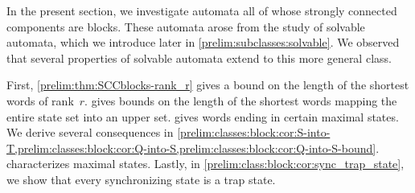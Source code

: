 
In the present section, we investigate automata all of whose strongly connected components are blocks. These automata arose from the study of solvable automata, which we introduce later in \cref{prelim:subclasses:solvable}. We observed that several properties of solvable automata extend to this more general class.

First, \cref{prelim:thm:SCCblocks-rank_r} gives a bound on the length of the shortest words of rank~$r$.  gives bounds on the length of the shortest words mapping the entire state set into an upper set.  gives words ending in certain maximal states. We derive several consequences in \cref{prelim:classes:block:cor:S-into-T,prelim:classes:block:cor:Q-into-S,prelim:classes:block:cor:Q-into-S-bound}.  characterizes maximal states. Lastly, in \cref{prelim:class:block:cor:sync_trap_state}, we show that every synchronizing state is a trap state.


